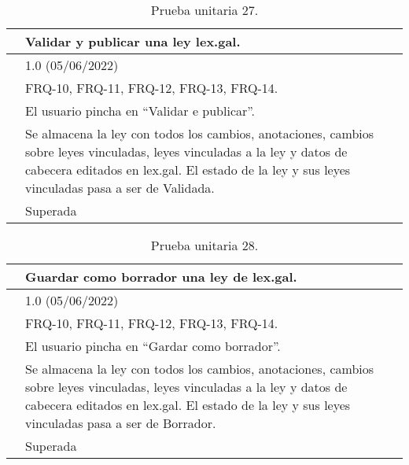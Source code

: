 \begin{table}[H]
\begin{center}
\begin{tabular}{|p{3cm}|p{10cm}|} \hline
\centering {\bf PU-27} & Validar y publicar una ley lex.gal.  \\ \hline\hline
\centering {\bf Versión} & 1.0 (05/06/2022) \\ \hline
\centering {\bf Dependencias} & FRQ-10, FRQ-11, FRQ-12, FRQ-13, FRQ-14. \\ \hline
\centering {\bf Descripción} &  El usuario pincha en ``Validar e publicar''. \\ \hline
\centering {\bf Criterio de aceptación} & Se almacena la ley con todos los cambios, anotaciones, cambios sobre leyes vinculadas, leyes vinculadas a la ley y datos de cabecera editados en lex.gal. El estado de la ley y sus leyes vinculadas pasa a ser de Validada. \\ \hline
\centering {\bf Estado} & Superada \\ \hline
\end{tabular}
\caption{Prueba unitaria 27.}
\label{enlacePU27}
\end{center}
\end{table}

\begin{table}[H]
\begin{center}
\begin{tabular}{|p{3cm}|p{10cm}|} \hline
\centering {\bf PU-28} & Guardar como borrador una ley de lex.gal.  \\ \hline\hline
\centering {\bf Versión} & 1.0 (05/06/2022) \\ \hline
\centering {\bf Dependencias} & FRQ-10, FRQ-11, FRQ-12, FRQ-13, FRQ-14. \\ \hline
\centering {\bf Descripción} &  El usuario pincha en ``Gardar como borrador''. \\ \hline
\centering {\bf Criterio de aceptación} & Se almacena la ley con todos los cambios, anotaciones, cambios sobre leyes vinculadas, leyes vinculadas a la ley y datos de cabecera editados en lex.gal. El estado de la ley y sus leyes vinculadas pasa a ser de Borrador. \\ \hline
\centering {\bf Estado} & Superada \\ \hline
\end{tabular}
\caption{Prueba unitaria 28.}
\label{enlacePU28}
\end{center}
\end{table}